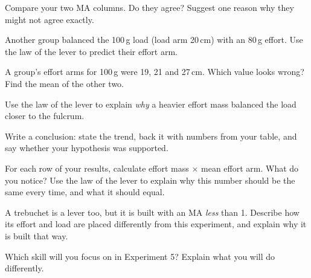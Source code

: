 \task Compare your two MA columns. Do they agree? Suggest one reason why they might not agree exactly. 

\task Another group balanced the 100\,g load (load arm 20\,cm) with an 80\,g effort. Use the law of the lever to predict their effort arm. 

\task A group's effort arms for 100\,g were 19, 21 and 27\,cm. Which value looks wrong? Find the mean of the other two.

\task Use the law of the lever to explain \emph{why} a heavier effort mass balanced the load closer to the fulcrum.

\task Write a conclusion: state the trend, back it with numbers from your table, and say whether your hypothesis was supported.


\begin{yr8box}
\begin{keepext}
\exttask For each row of your results, calculate effort mass $\times$ mean effort arm. What do you notice? Use the law of the lever to explain why this number should be the same every time, and what it should equal.
\end{keepext}
\begin{keepext}
\exttask A trebuchet is a lever too, but it is built with an MA \emph{less} than 1. Describe how its effort and load are placed differently from this experiment, and explain why it is built that way.
\end{keepext}
\end{yr8box}


\begin{skillcheck}
\end{skillcheck}

\task Which skill will you focus on in Experiment 5? Explain what you will do differently.
